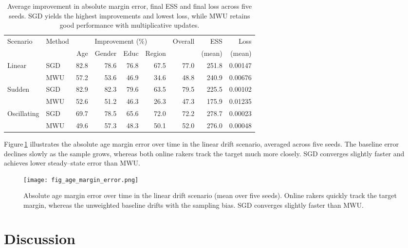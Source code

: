 \documentclass[12pt, letterpaper]{article}
\begin{document}
\begin{table}[ht]
  \centering
  \caption{Average improvement in absolute margin error, final ESS and
    final loss across five seeds.  SGD yields the highest
    improvements and lowest loss, while MWU retains good performance
    with multiplicative updates.}
  \label{tab:results}
  \begin{tabular}{@{}llrrrrrrr@{}}
    \toprule
    Scenario & Method & \multicolumn{4}{c}{Improvement (\%)} & Overall & ESS & Loss\\
    \cmidrule(lr){3-6}
    & & Age & Gender & Educ & Region & & (mean) & (mean)\\
    \midrule
    Linear & SGD & 82.8 & 78.6 & 76.8 & 67.5 & 77.0 & 251.8 & 0.00147\\
           & MWU & 57.2 & 53.6 & 46.9 & 34.6 & 48.8 & 240.9 & 0.00676\\
    Sudden & SGD & 82.9 & 82.3 & 79.6 & 63.5 & 79.5 & 225.5 & 0.00102\\
           & MWU & 52.6 & 51.2 & 46.3 & 26.3 & 47.3 & 175.9 & 0.01235\\
    Oscillating & SGD & 69.7 & 78.5 & 65.6 & 72.0 & 72.2 & 278.7 & 0.00023\\
               & MWU & 49.6 & 57.3 & 48.3 & 50.1 & 52.0 & 276.0 & 0.00048\\
    \bottomrule
  \end{tabular}
\end{table}

Figure\,\ref{fig:ageerror} illustrates the absolute age margin error
over time in the linear drift scenario, averaged across five seeds.
The baseline error declines slowly as the sample grows, whereas both
online rakers track the target much more closely.  SGD converges
slightly faster and achieves lower steady--state error than MWU.

\begin{figure}[ht]
  \centering
  \texttt{[image: fig\_age\_margin\_error.png]}
  \caption{Absolute age margin error over time in the linear drift
    scenario (mean over five seeds).  Online rakers quickly track the
    target margin, whereas the unweighted baseline drifts with the
    sampling bias.  SGD converges slightly faster than MWU.}
  \label{fig:ageerror}
\end{figure}

\section{Discussion}
\label{sec:discussion}
\end{document}
